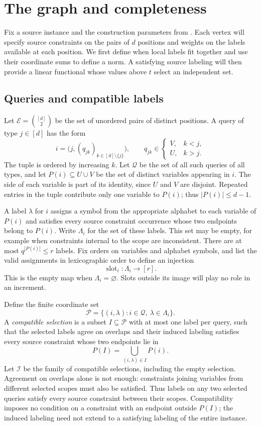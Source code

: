 \section{The graph and completeness}\label{graph:section}

Fix a source instance and the construction parameters from
. Each vertex will specify source constraints on the
pairs of \(d\) positions and weights on the labels available at each
position. We first define when local labels fit together and use their
coordinate sums to define a norm. A satisfying source labeling will
then provide a linear functional whose values above \(t\) select an
independent set.

\subsection{Queries and compatible labels}

Let $\mathcal E=\binom{[d]}2$ be the set of unordered pairs of distinct
positions.  A query of type $j\in[d]$ has the form
\[
 i=\bigl(j,(q_{jk})_{k\in[d]\setminus\{j\}}\bigr),
 \qquad
 q_{jk}\in
 \begin{cases}
  V,&k<j,\\
  U,&k>j.
 \end{cases}
\]
The tuple is ordered by increasing $k$.  Let $\mathcal Q$ be the set
of all such queries of all types, and let $P(i)\subseteq U\cup V$ be
the set of distinct variables appearing in $i$.  The side of each
variable is part of its identity, since $U$ and $V$ are disjoint.
Repeated entries in the tuple contribute only one variable to $P(i)$;
thus $|P(i)|\leq d-1$.

A label $\lambda$ for $i$ assigns a symbol from the appropriate
alphabet to each variable of $P(i)$ and satisfies every source
constraint occurrence whose two endpoints belong to $P(i)$.  Write
$\Lambda_i$ for the set of these labels.  This set may be empty, for
example when constraints internal to the scope are inconsistent.
There are at most $q^{|P(i)|}\leq r$ labels.  Fix orders on variables
and alphabet symbols, and list the valid assignments in lexicographic
order to define an injection
\[
 \operatorname{slot}_i:\Lambda_i\longrightarrow[r].
\]
This is the empty map when $\Lambda_i=\varnothing$.  Slots outside
its image will play no role in an increment.

Define the finite coordinate set
\[
 \mathcal P=\{(i,\lambda):i\in\mathcal Q,\ \lambda\in\Lambda_i\}.
\]
A \emph{compatible selection} is a subset $I\subseteq\mathcal P$
with at most one label per query, such that the selected labels agree
on overlaps and their induced labeling satisfies every source
constraint whose two endpoints lie in
\[
 P(I)=\bigcup_{(i,\lambda)\in I}P(i).
\]
Let $\mathcal I$ be the family of compatible selections, including
the empty selection. Agreement on overlaps alone is not enough:
constraints joining variables from different selected scopes must
also be satisfied. Thus labels on any two selected queries satisfy every source
constraint between their scopes.
Compatibility imposes no condition on a constraint with an endpoint
outside $P(I)$; the induced labeling need not extend to a satisfying
labeling of the entire instance.

